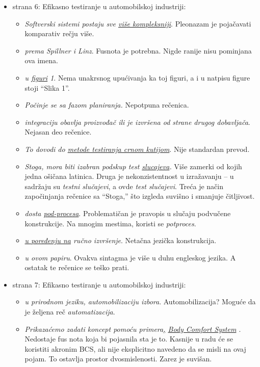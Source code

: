 \documentclass[a4paper]{report}
\begin{document}
\begin{itemize}
\item strana 6: Efikasno testiranje u automobilskoj industriji:
  \begin{itemize}
  \item {\em{Softverski sistemi postaju sve {\underline{više kompleksniji}}}}. Pleonazam je pojačavati komparativ rečju više.
\item {\em{prema Spillner i Linz}}. Fusnota je potrebna. Nigde ranije nisu pominjana ova imena.
\item {\em{ u {\underline{figuri}} 1}}. Nema unakrsnog upućivanja ka toj figuri, a i u natpisu figure stoji ``Slika 1''.
\item {\em{Počinje se sa fazom planiranja.}} Nepotpuna rečenica.
\item {\em{integraciju obavlja proizvođač ili je izvršena od strane drugog dobavljača}}. Nejasan deo rečenice.
\item {\em{To dovodi do {\underline{metode testiranja crnom kutijom}}}}. Nije standardan prevod.
\item {\em{Stoga, mora biti izabran podskup test {\underline{slucajeva}}.}} Više zamerki od kojih jedna ošičana latinica. Druga je nekonzistentnost u izražavanju -- u sadržaju su {\em{testni slučajevi}}, a ovde {\em{test slučajevi}}. Treća je način započinjanja rečenice sa ``Stoga,'' što izgleda suvišno i smanjuje čitljivost.
\item {\em{dosta {\underline{pod-procesa}}}}. Problematičan je pravopis u slučaju podvučene konstrukcije. Na mnogim mestima, koristi se {\em{potproces}}.
\item {\em{ {\underline{u poređenju na}} ručno izvršenje}}. Netačna jezička konstrukcija.
\item {\em{u ovom papiru}}. Ovakva sintagma je više u duhu engleskog jezika. A ostatak te rečenice se teško prati.
\end{itemize}
\end{itemize}

\begin{itemize}
\item strana 7: Efikasno testiranje u automobilskoj industriji:
  \begin{itemize}
\item {\em{u prirodnom jeziku, automobilizaciju izbora}}. Automobilizacija? Moguće da je željena reč {\em{automatizacija}}.
\item {\em{Prikazaćemo zadati koncept pomoću primera{\underline{,}} {\underline{Body Comfort System}} }}. Nedostaje fus nota koja bi pojasnila sta je to. Kasnije u radu će se koristiti akronim BCS, ali nije eksplicitno navedeno da se misli na ovaj pojam. To ostavlja prostor dvosmislenosti. Zarez je suvišan.
\end{itemize}
\end{itemize}
\end{document}
